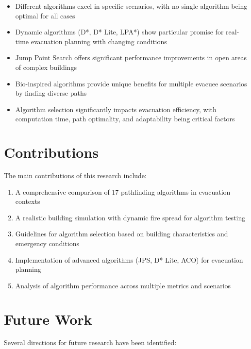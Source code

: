\documentclass[11pt,a4paper]{report}
\begin{document}
\begin{itemize}
    \item Different algorithms excel in specific scenarios, with no single algorithm being optimal for all cases
    \item Dynamic algorithms (D*, D* Lite, LPA*) show particular promise for real-time evacuation planning with changing conditions
    \item Jump Point Search offers significant performance improvements in open areas of complex buildings
    \item Bio-inspired algorithms provide unique benefits for multiple evacuee scenarios by finding diverse paths
    \item Algorithm selection significantly impacts evacuation efficiency, with computation time, path optimality, and adaptability being critical factors
\end{itemize}

\section{Contributions}
The main contributions of this research include:

\begin{enumerate}
    \item A comprehensive comparison of 17 pathfinding algorithms in evacuation contexts
    \item A realistic building simulation with dynamic fire spread for algorithm testing
    \item Guidelines for algorithm selection based on building characteristics and emergency conditions
    \item Implementation of advanced algorithms (JPS, D* Lite, ACO) for evacuation planning
    \item Analysis of algorithm performance across multiple metrics and scenarios
\end{enumerate}

\section{Future Work}
Several directions for future research have been identified:
\end{document}
